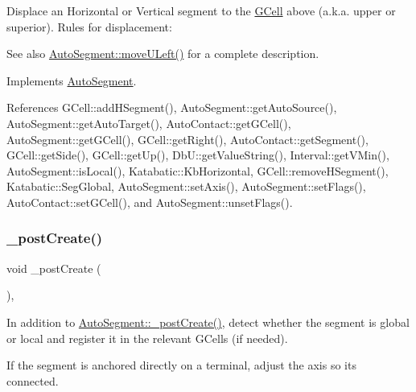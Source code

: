 Displace an Horizontal or Vertical segment to the \mbox{\hyperlink{classKatabatic_1_1GCell}{G\+Cell}} above (a.\+k.\+a. upper or superior). Rules for displacement\+:

\begin{DoxySeeAlso}{See also}
\mbox{\hyperlink{classKatabatic_1_1AutoSegment_af8ca7b17e952f4b599aeeb2f4e5be395}{Auto\+Segment\+::move\+U\+Left()}} for a complete description. 
\end{DoxySeeAlso}


Implements \mbox{\hyperlink{classKatabatic_1_1AutoSegment_ad7fd54ca229fcf5ccd99f87b019b9cbc}{Auto\+Segment}}.



References G\+Cell\+::add\+H\+Segment(), Auto\+Segment\+::get\+Auto\+Source(), Auto\+Segment\+::get\+Auto\+Target(), Auto\+Contact\+::get\+G\+Cell(), Auto\+Segment\+::get\+G\+Cell(), G\+Cell\+::get\+Right(), Auto\+Contact\+::get\+Segment(), G\+Cell\+::get\+Side(), G\+Cell\+::get\+Up(), Db\+U\+::get\+Value\+String(), Interval\+::get\+V\+Min(), Auto\+Segment\+::is\+Local(), Katabatic\+::\+Kb\+Horizontal, G\+Cell\+::remove\+H\+Segment(), Katabatic\+::\+Seg\+Global, Auto\+Segment\+::set\+Axis(), Auto\+Segment\+::set\+Flags(), Auto\+Contact\+::set\+G\+Cell(), and Auto\+Segment\+::unset\+Flags().

\mbox{\label{classKatabatic_1_1AutoVertical_a3715b38135ca24745f610bebd3407c10}} 
\subsubsection{\texorpdfstring{\+\_\+post\+Create()}{\_postCreate()}}
{\footnotesize\ttfamily void \+\_\+post\+Create (\begin{DoxyParamCaption}{ }\end{DoxyParamCaption})\hspace{0.3cm}{\ttfamily [protected]}, {\ttfamily [virtual]}}

In addition to \mbox{\hyperlink{classKatabatic_1_1AutoSegment_a3715b38135ca24745f610bebd3407c10}{Auto\+Segment\+::\+\_\+post\+Create()}}, detect whether the segment is global or local and register it in the relevant G\+Cells (if needed).

If the segment is anchored directly on a terminal, adjust the axis so it\textquotesingle{}s connected. 

